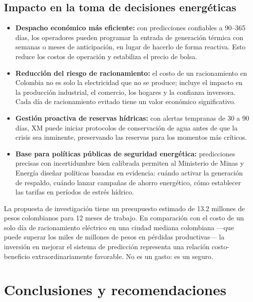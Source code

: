 \documentclass[11pt,a4paper]{article}
\begin{document}
\subsection{Impacto en la toma de decisiones energéticas}

\begin{itemize}[leftmargin=*,itemsep=4pt]
\item \textbf{Despacho económico más eficiente:} con predicciones confiables a 90--365 días, los operadores pueden programar la entrada de generación térmica con semanas o meses de anticipación, en lugar de hacerlo de forma reactiva. Esto reduce los costos de operación y estabiliza el precio de bolsa.
\item \textbf{Reducción del riesgo de racionamiento:} el costo de un racionamiento en Colombia no es solo la electricidad que no se produce; incluye el impacto en la producción industrial, el comercio, los hogares y la confianza inversora. Cada día de racionamiento evitado tiene un valor económico significativo.
\item \textbf{Gestión proactiva de reservas hídricas:} con alertas tempranas de 30 a 90 días, XM puede iniciar protocolos de conservación de agua antes de que la crisis sea inminente, preservando las reservas para los momentos más críticos.
\item \textbf{Base para políticas públicas de seguridad energética:} predicciones precisas con incertidumbre bien calibrada permiten al Ministerio de Minas y Energía diseñar políticas basadas en evidencia: cuándo activar la generación de respaldo, cuándo lanzar campañas de ahorro energético, cómo establecer las tarifas en períodos de estrés hídrico.
\end{itemize}

\begin{infobox}
La propuesta de investigación tiene un presupuesto estimado de 13.2 millones de pesos colombianos para 12 meses de trabajo. En comparación con el costo de un solo día de racionamiento eléctrico en una ciudad mediana colombiana —que puede superar los miles de millones de pesos en pérdidas productivas— la inversión en mejorar el sistema de predicción representa una relación costo-beneficio extraordinariamente favorable. No es un gasto: es un seguro.
\end{infobox}

\section{Conclusiones y recomendaciones}
\end{document}

